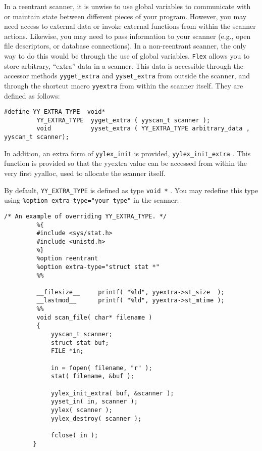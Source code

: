 \documentclass[openany,oneside]{book}
\begin{document}
In a reentrant scanner, it is unwise to use global variables to
communicate with or maintain state between different pieces of your program. 
However, you may need access to external data or invoke external functions
from within the scanner actions. 
Likewise, you may need to pass information to your scanner
(e.g., open file descriptors, or database connections). 
In a non-reentrant scanner, the only way to do this would be through the
use of global variables. \verb`Flex` allows you to store arbitrary, “extra” data in a scanner. 
This data is accessible through the accessor methods \verb`yyget_extra` and \verb`yyset_extra` from outside the scanner, and through the shortcut macro \verb`yyextra` from within the scanner itself. They are defined as follows:


\begin{verbatim}
#define YY_EXTRA_TYPE  void*
         YY_EXTRA_TYPE  yyget_extra ( yyscan_t scanner );
         void           yyset_extra ( YY_EXTRA_TYPE arbitrary_data , yyscan_t scanner);
\end{verbatim}


In addition, an extra form of \verb`yylex_init` is provided, \verb`yylex_init_extra` . This function is provided so that the yyextra value can
be accessed from within the very first yyalloc, used to allocate
the scanner itself.

By default, \verb`YY_EXTRA_TYPE` is defined as type \verb`void *` .  You
may redefine this type using \verb`%option extra-type="your_type"` in
the scanner:


\begin{verbatim}
/* An example of overriding YY_EXTRA_TYPE. */
         %{
         #include <sys/stat.h>
         #include <unistd.h>
         %}
         %option reentrant
         %option extra-type="struct stat *"
         %%
     
         __filesize__     printf( "%ld", yyextra->st_size  );
         __lastmod__      printf( "%ld", yyextra->st_mtime );
         %%
         void scan_file( char* filename )
         {
             yyscan_t scanner;
             struct stat buf;
             FILE *in;
     
             in = fopen( filename, "r" );
             stat( filename, &buf );
     
             yylex_init_extra( buf, &scanner );
             yyset_in( in, scanner );
             yylex( scanner );
             yylex_destroy( scanner );
     
             fclose( in );
        }
\end{verbatim}
\end{document}
